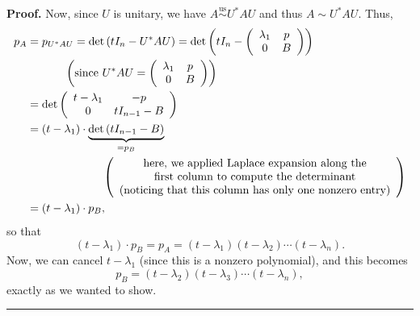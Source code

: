 \documentclass[numbers=enddot,12pt,final,onecolumn,notitlepage]{scrartcl}%
\numberwithin{exer}{subsection}
\theoremstyle{definition}
\newenvironment{proof}[1][Proof]{\noindent\textbf{#1.} }{\ \rule{0.5em}{0.5em}}
\begin{document}
\begin{proof}
Now, since $U$ is unitary, we have $A\overset{\operatorname*{us}}{\sim}%
U^{\ast}AU$ and thus $A\sim U^{\ast}AU$. Thus,%
\begin{align*}
p_{A}  &  =p_{U^{\ast}AU}=\det\left(  tI_{n}-U^{\ast}AU\right)  =\det\left(
tI_{n}-\left(
\begin{array}
[c]{cc}%
\lambda_{1} & p\\
0 & B
\end{array}
\right)  \right) \\
&  \ \ \ \ \ \ \ \ \ \ \left(  \text{since }U^{\ast}AU=\left(
\begin{array}
[c]{cc}%
\lambda_{1} & p\\
0 & B
\end{array}
\right)  \right) \\
&  =\det\left(
\begin{array}
[c]{cc}%
t-\lambda_{1} & -p\\
0 & tI_{n-1}-B
\end{array}
\right) \\
&  =\left(  t-\lambda_{1}\right)  \cdot\underbrace{\det\left(  tI_{n-1}%
-B\right)  }_{=p_{B}}\\
&  \ \ \ \ \ \ \ \ \ \ \ \ \ \ \ \ \ \ \ \ \left(
\begin{array}
[c]{c}%
\text{here, we applied Laplace expansion along the}\\
\text{first column to compute the determinant}\\
\text{(noticing that this column has only one nonzero entry)}%
\end{array}
\right) \\
&  =\left(  t-\lambda_{1}\right)  \cdot p_{B},
\end{align*}
so that%
\[
\left(  t-\lambda_{1}\right)  \cdot p_{B}=p_{A}=\left(  t-\lambda_{1}\right)
\left(  t-\lambda_{2}\right)  \cdots\left(  t-\lambda_{n}\right)  .
\]
Now, we can cancel $t-\lambda_{1}$ (since this is a nonzero polynomial), and
this becomes%
\[
p_{B}=\left(  t-\lambda_{2}\right)  \left(  t-\lambda_{3}\right)
\cdots\left(  t-\lambda_{n}\right)  ,
\]
exactly as we wanted to show.
\end{proof}
\end{document}
